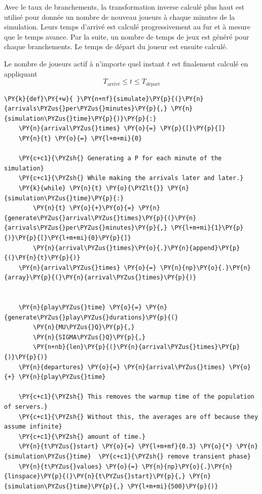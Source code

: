 Avec le taux de branchements, la transformation inverse calculé plus
haut est utilisé pour donnée un nombre de nouveau joueurs à chaque
minutes de la simulation. Leurs temps d'arrivé est calculé
progressivement au fur et à mesure que le temps avance. Par la suite, un
nombre de temps de jeux est généré pour chaque branchements. Le temps de
départ du joueur est ensuite calculé.

Le nombre de joueurs actif à n'importe quel instant \(t\) est finalement
calculé en appliquant \[
    T_{\text{arrivé}} \le t \le T_{\text{départ}}
\]

    \begin{tcolorbox}[breakable, size=fbox, boxrule=1pt, pad at break*=1mm,colback=cellbackground, colframe=cellborder]
\begin{Verbatim}[commandchars=\\\{\}]
\PY{k}{def}\PY{+w}{ }\PY{n+nf}{simulate}\PY{p}{(}\PY{n}{arrivals\PYZus{}per\PYZus{}minutes}\PY{p}{,} \PY{n}{simulation\PYZus{}time}\PY{p}{)}\PY{p}{:}
    \PY{n}{arrival\PYZus{}times} \PY{o}{=} \PY{p}{[}\PY{p}{]}
    \PY{n}{t} \PY{o}{=} \PY{l+m+mi}{0}

    \PY{c+c1}{\PYZsh{} Generating a P for each minute of the simulation}
    \PY{c+c1}{\PYZsh{} While making the arrivals later and later.}
    \PY{k}{while} \PY{n}{t} \PY{o}{\PYZlt{}} \PY{n}{simulation\PYZus{}time}\PY{p}{:}
        \PY{n}{t} \PY{o}{+}\PY{o}{=} \PY{n}{generate\PYZus{}arrival\PYZus{}times}\PY{p}{(}\PY{n}{arrivals\PYZus{}per\PYZus{}minutes}\PY{p}{,} \PY{l+m+mi}{1}\PY{p}{)}\PY{p}{[}\PY{l+m+mi}{0}\PY{p}{]}
        \PY{n}{arrival\PYZus{}times}\PY{o}{.}\PY{n}{append}\PY{p}{(}\PY{n}{t}\PY{p}{)}
    \PY{n}{arrival\PYZus{}times} \PY{o}{=} \PY{n}{np}\PY{o}{.}\PY{n}{array}\PY{p}{(}\PY{n}{arrival\PYZus{}times}\PY{p}{)}


    \PY{n}{play\PYZus{}time} \PY{o}{=} \PY{n}{generate\PYZus{}play\PYZus{}durations}\PY{p}{(}
        \PY{n}{MU\PYZus{}Q}\PY{p}{,}
        \PY{n}{SIGMA\PYZus{}Q}\PY{p}{,}
        \PY{n+nb}{len}\PY{p}{(}\PY{n}{arrival\PYZus{}times}\PY{p}{)}\PY{p}{)}
    \PY{n}{departures} \PY{o}{=} \PY{n}{arrival\PYZus{}times} \PY{o}{+} \PY{n}{play\PYZus{}time}

    \PY{c+c1}{\PYZsh{} This removes the warmup time of the population of servers.}
    \PY{c+c1}{\PYZsh{} Without this, the averages are off because they assume infinite}
    \PY{c+c1}{\PYZsh{} amount of time.}
    \PY{n}{t\PYZus{}start} \PY{o}{=} \PY{l+m+mf}{0.3} \PY{o}{*} \PY{n}{simulation\PYZus{}time}  \PY{c+c1}{\PYZsh{} remove transient phase}
    \PY{n}{t\PYZus{}values} \PY{o}{=} \PY{n}{np}\PY{o}{.}\PY{n}{linspace}\PY{p}{(}\PY{n}{t\PYZus{}start}\PY{p}{,} \PY{n}{simulation\PYZus{}time}\PY{p}{,} \PY{l+m+mi}{500}\PY{p}{)}


\end{Verbatim}
\end{tcolorbox}
